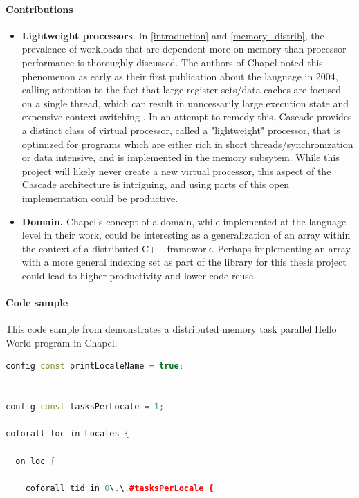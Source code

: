 {	\paragraph{Contributions}
	\begin{itemize}
		\item \textbf{Lightweight processors}. In \ref{introduction} and \ref{memory_distrib}, the prevalence of workloads that are dependent more on memory than processor performance is thoroughly discussed. The authors of Chapel noted this phenomenon as early as their first publication about the language in 2004, calling attention to the fact that large register sets/data caches are focused on a single thread, which can result in unncessarily large execution state and expensive context switching \cite{chapel}. In an attempt to remedy this, Cascade provides a distinct class of virtual processor, called a "lightweight" processor, that is optimized for programs which are either rich in short threads/synchronization or data intensive, and is implemented in the memory subsytem. While this project will likely never create a new virtual processor, this aspect of the Cascade architecture is intriguing, and using parts of this open implementation could be productive. 


		\item \textbf{Domain.} Chapel's concept of a domain, while implemented at the language level in their work, could be interesting as a generalization of an array within the context of a distributed C++ framework. Perhaps implementing an array with a more general indexing set as part of the library for this thesis project could lead to higher productivity and lower code reuse. 

	\end{itemize}

	\paragraph{Code sample}
	This code sample from \cite{chapel_github} demonstrates a distributed memory task parallel Hello World program in Chapel.
		
	\begin{lstlisting}[language=C++, caption=Hello World in Chapel, captionpos=b]
config const printLocaleName = true;


config const tasksPerLocale = 1;

coforall loc in Locales {

  on loc {

    coforall tid in 0\.\.#tasksPerLocale {


\end{lstlisting}}
